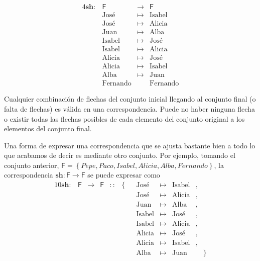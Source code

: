\documentclass{amsart}
\theoremstyle{definition}
\theoremstyle{remark}
\numberwithin{equation}{section}
\newcommand{\set}[1]{\left\lbrace{#1}\right\rbrace}
\newcommand{\fromto}{\longrightarrow}
\newcommand{\setsymbol}[1]{\textsf{#1}}
\newcommand{\sF}{\setsymbol{F}}
\newcommand{\monrel}[1]{\mathbf{#1}}
\begin{document}
	
	\begin{alignat*}{4}
		\monrel{sh} : &\sF &\fromto &\sF                   \\
		&\text{José}     &\mapsto  &\text{Isabel}          \\
		&\text{José}     &\mapsto  &\text{Alicia}          \\
		&\text{Juan}     &\mapsto  &\text{Alba}            \\
		&\text{Isabel}   &\mapsto  &\text{José}            \\
		&\text{Isabel}   &\mapsto  &\text{Alicia}          \\
		&\text{Alicia}   &\mapsto  &\text{José}            \\
		&\text{Alicia}   &\mapsto  &\text{Isabel}          \\
		&\text{Alba}     &\mapsto  &\text{Juan}            \\
		&\text{Fernando} & \;      &\text{Fernando}
	\end{alignat*}
	
	
	Cualquier combinación de flechas del conjunto inicial llegando al 
conjunto final (o falta de flechas) es válida en una correspondencia. Puede 
no haber ninguna flecha o existir todas las flechas posibles de cada elemento 
del conjunto original a los elementos del conjunto final.
	
	
	Una forma de expresar una correspondencia que se ajusta bastante bien a 
todo lo que acabamos de decir es mediante otro conjunto. Por ejemplo, tomando 
el conjunto anterior, $\sF=\set{Pepe, Paco, Isabel, Alicia, Alba, Fernando}$,
la correspondencia $\monrel{sh}:\sF\fromto\sF$ se puede expresar como
	\begin{alignat*}{10}
		\monrel{sh} : & \sF & \fromto & \sF & :: & \{ && \text{José}   &
 \mapsto & \text{Isabel} & , & \\
		&&&&&&& \text{José}   & \mapsto & \text{Alicia} & ,&\\ 
		&&&&&&& \text{Juan}   & \mapsto & \text{Alba} & ,  &\\
		&&&&&&& \text{Isabel} & \mapsto & \text{José} & ,  &\\
		&&&&&&& \text{Isabel} & \mapsto & \text{Alicia} & ,&\\ 
		&&&&&&& \text{Alicia} & \mapsto & \text{José} & ,  &\\
		&&&&&&& \text{Alicia} & \mapsto & \text{Isabel} & ,&\\
		&&&&&&& \text{Alba}   & \mapsto & \text{Juan}   && \} 
	\end{alignat*} 
	
\end{document}
